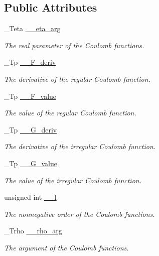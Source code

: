 \subsection*{Public Attributes}
\begin{DoxyCompactItemize}
\item 
\+\_\+\+Teta \hyperlink{struct____gnu__cxx_1_1____cyl__coulomb__t_a87cab64e451b20d09eade3c3466f8922}{\+\_\+\+\_\+eta\+\_\+arg}
\begin{DoxyCompactList}\small\item\em The real parameter of the Coulomb functions. \end{DoxyCompactList}\item 
\+\_\+\+Tp \hyperlink{struct____gnu__cxx_1_1____cyl__coulomb__t_ac404bcd6df6837a5998b6a491c60a838}{\+\_\+\+\_\+\+F\+\_\+deriv}
\begin{DoxyCompactList}\small\item\em The derivative of the regular Coulomb function. \end{DoxyCompactList}\item 
\+\_\+\+Tp \hyperlink{struct____gnu__cxx_1_1____cyl__coulomb__t_ad8c07e9654985d2e26da21bf4559b419}{\+\_\+\+\_\+\+F\+\_\+value}
\begin{DoxyCompactList}\small\item\em The value of the regular Coulomb function. \end{DoxyCompactList}\item 
\+\_\+\+Tp \hyperlink{struct____gnu__cxx_1_1____cyl__coulomb__t_abeb1f1f5aa39d4664872b8c43612f33e}{\+\_\+\+\_\+\+G\+\_\+deriv}
\begin{DoxyCompactList}\small\item\em The derivative of the irregular Coulomb function. \end{DoxyCompactList}\item 
\+\_\+\+Tp \hyperlink{struct____gnu__cxx_1_1____cyl__coulomb__t_a918861ff5873097675aa5fc9d5d3a5cd}{\+\_\+\+\_\+\+G\+\_\+value}
\begin{DoxyCompactList}\small\item\em The value of the irregular Coulomb function. \end{DoxyCompactList}\item 
unsigned int \hyperlink{struct____gnu__cxx_1_1____cyl__coulomb__t_a402fdb5865c435194f923e50e551799e}{\+\_\+\+\_\+l}
\begin{DoxyCompactList}\small\item\em The nonnegative order of the Coulomb functions. \end{DoxyCompactList}\item 
\+\_\+\+Trho \hyperlink{struct____gnu__cxx_1_1____cyl__coulomb__t_abbff84a3b281ef7fc6f16245c02b695d}{\+\_\+\+\_\+rho\+\_\+arg}
\begin{DoxyCompactList}\small\item\em The argument of the Coulomb functions. \end{DoxyCompactList}\end{DoxyCompactItemize}


